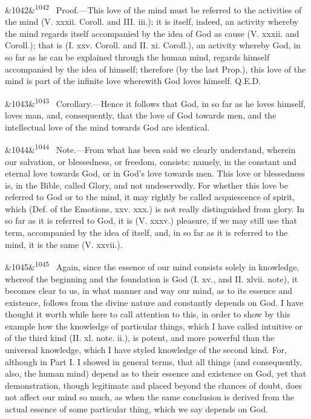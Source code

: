 \documentclass[12pt]{article}
\newcommand{\para}[1][]{\par\noindent\ifx&#1&\else\textsuperscript{\footnotesize #1}~\fi}
\begin{document}
\para[1042] Proof.---This love of the mind must be referred to the activities of the mind (V. xxxii. Coroll. and III. iii.); it is itself, indeed, an activity whereby the mind regards itself accompanied by the idea of God as cause (V. xxxii. and Coroll.); that is (I. xxv. Coroll. and II. xi. Coroll.), an activity whereby God, in so far as he can be explained through the human mind, regards himself accompanied by the idea of himself; therefore (by the last Prop.), this love of the mind is part of the infinite love wherewith God loves himself. Q.E.D.

\para[1043] Corollary.---Hence it follows that God, in so far as he loves himself, loves man, and, consequently, that the love of God towards men, and the intellectual love of the mind towards God are identical.

\para[1044] Note.---From what has been said we clearly understand, wherein our salvation, or blessedness, or freedom, consists: namely, in the constant and eternal love towards God, or in God's love towards men. This love or blessedness is, in the Bible, called Glory, and not undeservedly. For whether this love be referred to God or to the mind, it may rightly be called acquiescence of spirit, which (Def. of the Emotions, xxv. xxx.) is not really distinguished from glory. In so far as it is referred to God, it is (V. xxxv.) pleasure, if we may still use that term, accompanied by the idea of itself, and, in so far as it is referred to the mind, it is the same (V. xxvii.).

\para[1045] Again, since the essence of our mind consists solely in knowledge, whereof the beginning and the foundation is God (I. xv., and II. xlvii. note), it becomes clear to us, in what manner and way our mind, as to its essence and existence, follows from the divine nature and constantly depends on God. I have thought it worth while here to call attention to this, in order to show by this example how the knowledge of particular things, which I have called intuitive or of the third kind (II. xl. note. ii.), is potent, and more powerful than the universal knowledge, which I have styled knowledge of the second kind. For, although in Part I. I showed in general terms, that all things (and consequently, also, the human mind) depend as to their essence and existence on God, yet that demonstration, though legitimate and placed beyond the chances of doubt, does not affect our mind so much, as when the same conclusion is derived from the actual essence of some particular thing, which we say depends on God.
\end{document}
